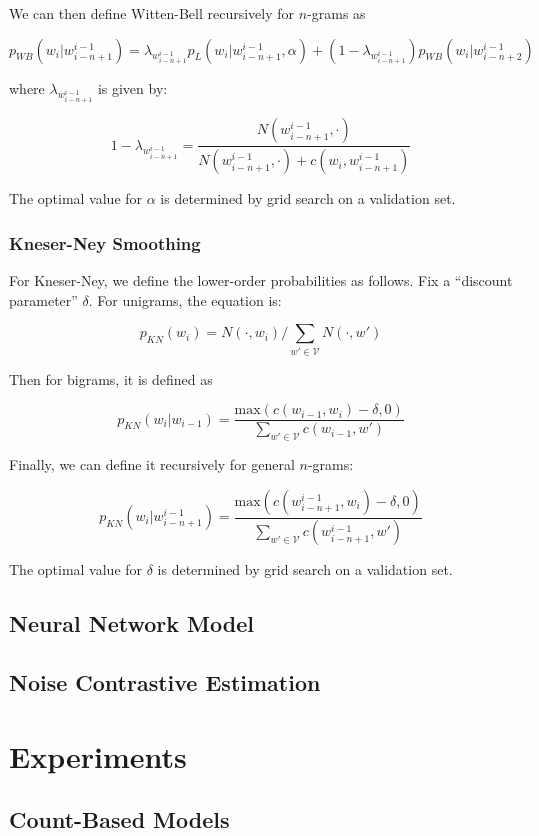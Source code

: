 \documentclass[11pt]{article}
\begin{document}
We can then define Witten-Bell recursively for $n$-grams as

$$p_{WB}(w_i|w^{i-1}_{i-n+1}) = \lambda_{w^{i-1}_{i-n+1}} p_L(w_i|w^{i-1}_{i-n+1}, \alpha) + (1-\lambda_{w^{i-1}_{i-n+1}}) p_{WB}(w_i|w^{i-1}_{i-n+2})$$

where $\lambda_{w^{i-1}_{i-n+1}}$ is given by:

$$1 - \lambda_{w^{i-1}_{i-n+1}} = \frac{N(w^{i-1}_{i-n+1}, \cdot)}{N(w^{i-1}_{i-n+1}, \cdot) + c(w_i, w^{i-1}_{i-n+1})}$$ 

The optimal value for $\alpha$ is determined by grid search on a validation set. 

\subsubsection{Kneser-Ney Smoothing}

For Kneser-Ney, we define the lower-order probabilities as follows. Fix a ``discount parameter'' $\delta$. For unigrams, the equation is:

$$p_{KN}(w_i) = N(\cdot, w_i)/\sum_{w' \in \mathcal{V}} N(\cdot, w')$$

Then for bigrams, it is defined as 

$$p_{KN}(w_i | w_{i-1}) = \frac{\text{max}(c(w_{i-1}, w_i) - \delta, 0)}{\sum_{w' \in \mathcal{V}} c(w_{i-1}, w')}$$

Finally, we can define it recursively for general $n$-grams:

$$p_{KN}(w_i | w^{i-1}_{i-n+1}) = \frac{\text{max}(c(w^{i-1}_{i-n+1}, w_i) - \delta, 0)}{\sum_{w' \in \mathcal{V}}c(w^{i-1}_{i-n+1}, w')}$$

The optimal value for $\delta$ is determined by grid search on a validation set. 

\subsection{Neural Network Model}

\subsection{Noise Contrastive Estimation}

\section{Experiments}

\subsection{Count-Based Models}
\end{document}
